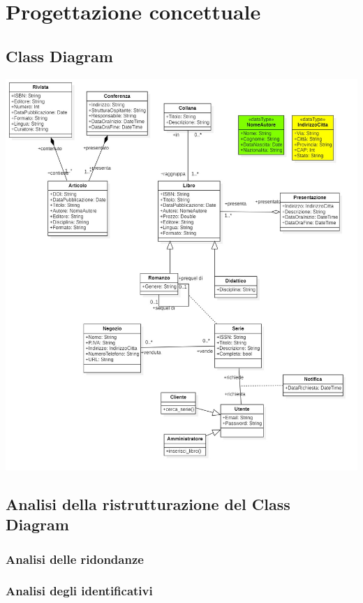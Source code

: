 \chapter{Progettazione concettuale}
    \section{Class Diagram}

    \includegraphics[scale=0.3]{Immagini/UMLv6.png}
        
    \section{Analisi della ristrutturazione del Class Diagram}
        
        \subsection{Analisi delle ridondanze}
            
        \subsection{Analisi degli identificativi}
            
